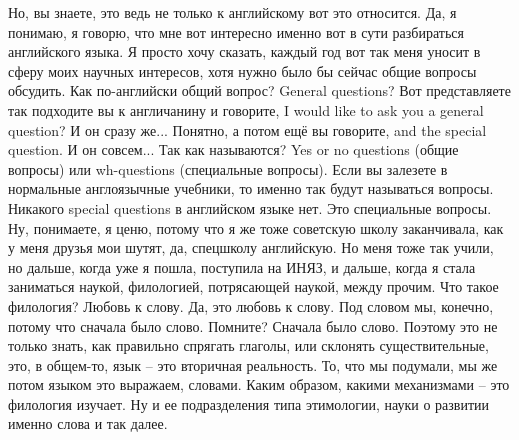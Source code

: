 \documentclass[main.tex]{subfiles}
\begin{document}
Но, вы знаете, это ведь не только к английскому вот это относится.
Да, я понимаю, я говорю, что мне вот интересно именно вот в сути разбираться английского языка.
Я просто хочу сказать, каждый год вот так меня уносит в сферу моих научных интересов, хотя нужно было бы сейчас общие вопросы обсудить.
Как по-английски общий вопрос?
General questions?
Вот представляете так подходите вы к англичанину и говорите, I would like to ask you a general question?
И он сразу же...
Понятно, а потом ещё вы говорите, and the special question.
И он совсем...
Так как называются?
Yes or no questions (общие вопросы) или wh-questions (специальные вопросы).
Если вы залезете в нормальные англоязычные учебники, то именно так будут называться вопросы.
Никакого special questions в английском языке нет.
Это специальные вопросы.
Ну, понимаете, я ценю, потому что я же тоже советскую школу заканчивала, как у меня друзья мои шутят, да, спецшколу английскую.
Но меня тоже так учили, но дальше, когда уже я пошла, поступила на ИНЯЗ, и дальше, когда я стала заниматься наукой, филологией, потрясающей наукой, между прочим.
Что такое филология?
Любовь к слову.
Да, это любовь к слову.
Под словом мы, конечно, потому что сначала было слово.
Помните?
Сначала было слово.
Поэтому это не только знать, как правильно спрягать глаголы, или склонять существительные, это, в общем-то, язык -- это вторичная реальность.
То, что мы подумали, мы же потом языком это выражаем, словами.
Каким образом, какими механизмами -- это филология изучает.
Ну и ее подразделения типа этимологии, науки о развитии именно слова и так далее.
\end{document}
